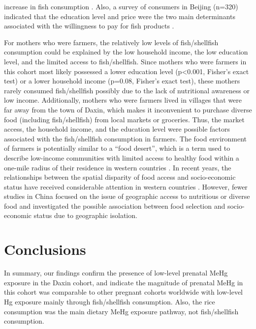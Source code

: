 increase in fish consumption \citep{zhou2015determinants}. Also, a survey of consumers in Beijing (n=320) indicated that the education level and price were the two main determinants associated with the willingness to pay for fish products \citep{wang2009consumers}.

For mothers who were farmers, the relatively low levels of fish/shellfish consumption could be explained by the low household income, the low education level, and the limited access to fish/shellfish. Since mothers who were farmers in this cohort most likely possessed a lower education level (p<0.001, Fisher's exact test) or a lower household income (p=0.08, Fisher's exact test), these mothers rarely consumed fish/shellfish possibly due to the lack of nutritional awareness or low income. Additionally, mothers who were farmers lived in villages that were far away from the town of Daxin, which makes it inconvenient to purchase diverse food (including fish/shellfish) from local markets or groceries. Thus, the market access, the household income, and the education level were possible factors associated with the fish/shellfish consumption in farmers. The food environment of farmers is potentially similar to a ``food desert'', which is a term used to describe low-income communities with limited access to healthy food within a one-mile radius of their residence in western countries \citep{cdc2016fooddeserts}. In recent years, the relationships between the spatial disparity of food access and socio-economic status have received considerable attention in western countries \citep{moore2006associations,glanz2007nutrition,powell2007food}. However, fewer studies in China focused on the issue of geographic access to nutritious or diverse food and investigated the possible association between food selection and socio-economic status due to geographic isolation.

\section{Conclusions}

In summary, our findings confirm the presence of low-level prenatal MeHg exposure in the Daxin cohort, and indicate the magnitude of prenatal MeHg in this cohort was comparable to other pregnant cohorts worldwide with low-level Hg exposure mainly through fish/shellfish consumption. Also, the rice consumption was the main dietary MeHg exposure pathway, not fish/shellfish consumption.


